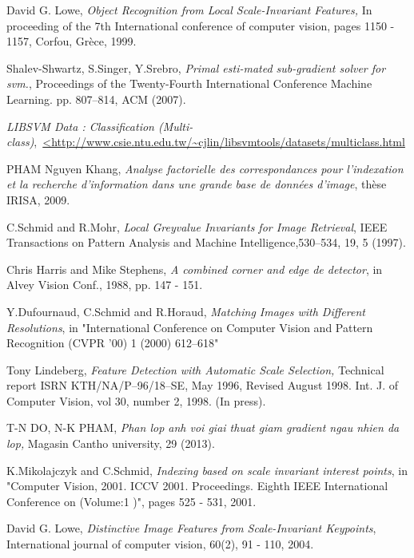 \cleardoublepage
{}
{}
\begin{thebibliography}{99}

 David G. Lowe, \emph{Object Recognition from Local Scale-Invariant Features,} In proceeding of the 7th International conference of computer vision, pages 1150 - 1157, Corfou, Grèce, 1999.

 Shalev-Shwartz, S.Singer, Y.Srebro, \emph{Primal esti-mated sub-gradient solver for svm.}, Proceedings of the Twenty-Fourth International Conference Machine Learning. pp. 807–814, ACM (2007).

\emph{LIBSVM Data : Classification (Multi-class)},\ \url{<http://www.csie.ntu.edu.tw/~cjlin/libsvmtools/datasets/multiclass.html}

 PHAM Nguyen Khang, \emph{Analyse factorielle des correspondances pour l'indexation et la recherche d'information dans une grande base de données d'image}, thèse IRISA, 2009.

 C.Schmid and R.Mohr, \emph{Local Greyvalue Invariants for Image Retrieval}, IEEE Transactions on Pattern Analysis and Machine Intelligence,530--534, 19, 5 (1997).

 Chris Harris and Mike Stephens, \emph{A combined corner and edge de detector},  in Alvey Vision Conf., 1988, pp. 147 - 151.

 Y.Dufournaud, C.Schmid and R.Horaud, \emph{Matching Images with Different Resolutions}, in "International Conference on Computer Vision and Pattern Recognition (CVPR '00) 1 (2000) 612--618"

 Tony Lindeberg, \emph{Feature Detection with Automatic Scale Selection,} Technical report ISRN KTH/NA/P–96/18–SE, May 1996, Revised August 1998. Int. J. of Computer Vision, vol 30, number 2, 1998. (In press).

 T-N DO, N-K PHAM, \emph{Phan lop anh voi giai thuat giam gradient ngau nhien da lop,} Magasin Cantho university, 29 (2013).

 K.Mikolajczyk and C.Schmid, \emph{Indexing based on scale invariant interest points}, in "Computer Vision, 2001. ICCV 2001. Proceedings. Eighth IEEE International Conference on  (Volume:1 )", pages 525 - 531, 2001.

 David G. Lowe, \emph{Distinctive Image Features from Scale-Invariant Keypoints}, International journal of computer vision, 60(2), 91 - 110, 2004.


\end{thebibliography}
